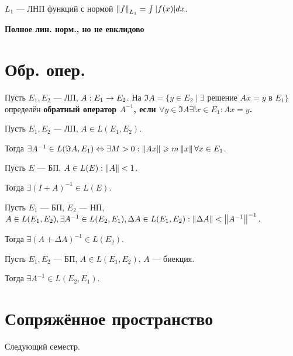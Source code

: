 \begin{defn}
$L_1$ --- ЛНП функций с нормой $\left\lVert f\right\rVert_{L_1} = \int |f(x)| dx$.

\bf{Полное лин. норм., но не евклидово}
\end{defn}

\section{Обр. опер.}

\begin{defn}
Пусть $E_1, E_2$ --- ЛП, $A: E_1 \rightarrow E_2$. На $\Im A = \{y \in E_2\mid \exists$ решение $Ax=y$ в $E_1\}$ определён \bf{обратный оператор} $A^{-1}$, если $\forall y \in \Im A \exists! x \in E_1: Ax=y$.
\end{defn}

\begin{thm}[6.1]
Пусть $E_1, E_2$ --- ЛП, $A \in L(E_1, E_2)$. 

Тогда $\exists A^{-1} \in L(\Im A, E_1) \Leftrightarrow \exists M>0: \left\lVert Ax\right\rVert \geqslant m \left\lVert x\right\rVert \forall x \in E_1$.
\end{thm}

\begin{thm}[6.2]
Пусть $E$ --- БП, $A \in L(E): \left\lVert A\right\rVert < 1$. 

Тогда $\exists (I+A)^{-1} \in L(E)$.
\end{thm}

\begin{thm}[6.3]
Пусть $E_1$ --- БП, $E_2$ --- НП, $A \in L(E_1, E_2), \exists A^{-1} \in L(E_2, E_1), \Delta A \in L(E_1, E_2): \left\lVert\Delta A\right\rVert < \left\lVert A^{-1}\right\rVert^{-1}$.

Тогда $\exists (A+\Delta A)^{-1} \in L(E_2)$.
\end{thm}

\begin{thm}
Пусть $E_1, E_2$ --- БП, $A \in L(E_1, E_2)$, $A$ --- биекция.

Тогда $\exists A^{-1} \in L(E_2, E_1)$.
\end{thm}

\section{Сопряжённое пространство}
Следующий семестр.


